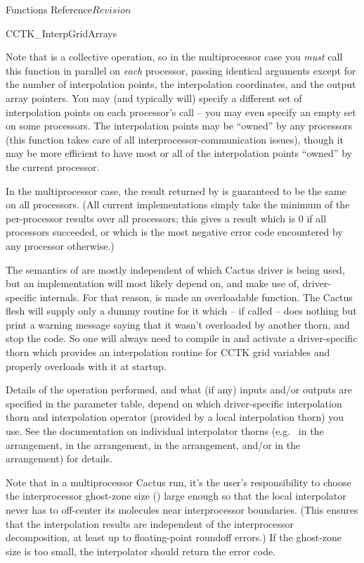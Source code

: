 \begin{cactuspart}{ Functions Reference}{}{$Revision$}
\begin{FunctionDescription}{CCTK\_InterpGridArrays}
\begin{Discussion}
Note that  is a collective operation, so in the
multiprocessor case you {\em must\/} call this function in parallel on
{\em each\/} processor, passing identical arguments except for the number of
interpolation points, the interpolation coordinates, and the output array
pointers.  You may (and typically will) specify a different set of
interpolation points on each processor's call -- you may even specify
an empty set on some processors.  The interpolation points may be
``owned'' by any processors (this function takes care of all
interprocessor-communication issues), though it may be more efficient
to have most or all of the interpolation points ``owned'' by the
current processor.

In the multiprocessor case, the result returned by
 is guaranteed to be the same on all
processors.  (All current implementations simply take the minimum
of the per-processor results over all processors; this gives a
result which is 0 if all processors succeeded, or which is the most
negative error code encountered by any processor otherwise.)

The semantics of  are mostly independent of
which Cactus driver is being used, but an implementation will most likely
depend on, and make use of, driver-specific internals. For that reason,
 is made an overloadable function. The Cactus
flesh will supply only a dummy routine for it which -- if called -- does
nothing but print a warning message saying that it wasn't overloaded by
another thorn, and stop the code. So one will always need to compile in
and activate a driver-specific thorn which provides an interpolation routine
for CCTK grid variables and properly overloads 
with it at startup.

Details of the operation performed, and what (if any) inputs and/or
outputs are specified in the parameter table, depend on which driver-specific
interpolation thorn and interpolation operator (provided by a local
interpolation thorn) you use.  See the documentation on individual interpolator
thorns (e.g.\  in the  arrangement,
 in the  arrangement,
 in the  arrangement, and/or
 in the  arrangement) for details.

Note that in a multiprocessor Cactus run, it's the user's responsibility
to choose the interprocessor ghost-zone size ()
large enough so that the local interpolator never has to off-center
its molecules near interprocessor boundaries.  (This ensures that the
interpolation results are independent of the interprocessor decomposition,
at least up to floating-point roundoff errors.)
If the ghost-zone size is too small, the interpolator should return
the  error code.
\end{Discussion}


\end{FunctionDescription}
\end{cactuspart}

